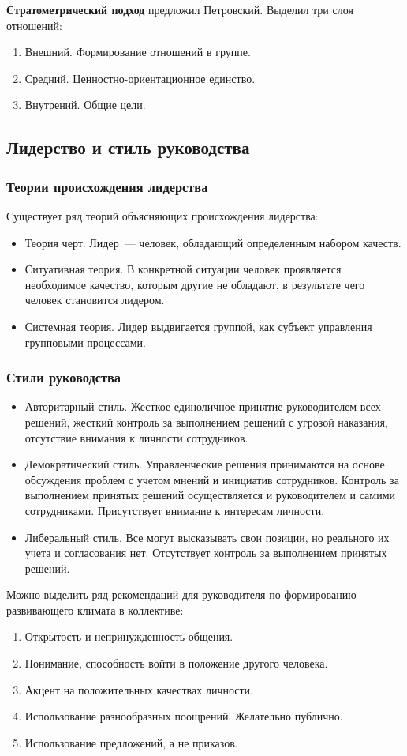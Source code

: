 \textbf{Стратометрический подход} предложил Петровский. Выделил три слоя отношений:
\begin{enumerate}
	\item Внешний. Формирование отношений в группе.
	\item Средний. Ценностно-ориентационное единство.
	\item Внутрений. Общие цели.
\end{enumerate}

\subsection{Лидерство и стиль руководства}
\subsubsection{Теории происхождения лидерства}
Существует ряд теорий объясняющих происхождения лидерства:
\begin{itemize}
	\item Теория черт. Лидер~--- человек, обладающий определенным набором качеств.
	\item Ситуативная теория. В конкретной ситуации человек проявляется необходимое качество, которым другие не обладают, в результате чего человек становится лидером.
	\item Системная теория. Лидер выдвигается группой, как субъект управления групповыми процессами.
\end{itemize}

\subsubsection{Стили руководства}
\begin{itemize}
	\item Авторитарный стиль. Жесткое единоличное принятие руководителем всех решений, жесткий контроль за выполнением решений с угрозой наказания, отсутствие внимания к личности сотрудников.
	\item Демократический стиль. Управленческие решения принимаются на основе обсуждения проблем с учетом мнений и инициатив сотрудников. Контроль за выполнением принятых решений осуществляется и руководителем и самими сотрудниками. Присутствует внимание к интересам личности.
	\item Либеральный стиль. Все могут высказывать свои позиции, но реального их учета и согласования нет. Отсутствует контроль за выполнением принятых решений.
\end{itemize}
Можно выделить ряд рекомендаций для руководителя по формированию развивающего климата в коллективе:
\begin{enumerate}
	\item Открытость и непринужденность общения.
	\item Понимание, способность войти в положение другого человека.
	\item Акцент на положительных качествах личности.
	\item Использование разнообразных поощрений. Желательно публично.
	\item Использование предложений, а не приказов.
\end{enumerate}

